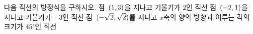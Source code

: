 다음 직선의 방정식을 구하시오.
 점~$(1{,}\mkern3mu\mathopen{}3)$을 지나고 기울기가 $2$인 직선
 점~$(-2{,}\mkern3mu\mathopen{}1)$을 지나고 기울기가 $-3$인 직선
 점~$(-\sqrt{2}{,}\mkern3mu\mathopen{}\sqrt{2})$를 지나고 $x$축의 양의 방향과 이루는 각의 크기가 $45^\circ$인 직선
